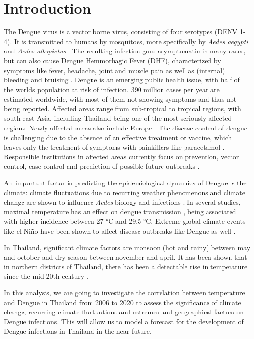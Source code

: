 \section{Introduction}\label{sec:introduction}

The Dengue virus is a vector borne virus, consisting of four serotypes (DENV 1-4).  It is transmitted to humans by mosquitoes, more specifically by \emph{Aedes aegypti} and \emph{Aedes albopictus} \citep{Phanitchat.2019}. The resulting infection goes asymptomatic in many cases, but can also cause Dengue Hemmorhagic Fever (DHF), characterized by symptoms like fever, headache, joint and muscle pain as well as (internal) bleeding and bruising \citep{Gubler.1998}.
Dengue is an emerging public health issue, with half of the worlds population at risk of infection. 390 million cases per year are estimated worldwide, with most of them not showing symptoms and thus not being reported. Affected areas range from sub-tropical to tropical regions, with south-east Asia, including Thailand being one of the most seriously affected regions. Newly affected areas also include Europe \citep{WHO.2023}.
The disease control of dengue is challenging due to the absence of an effective treatment or vaccine, which leaves only the treatment of symptoms with painkillers like paracetamol \citep{WHO.2023}. Responsible institutions in affected areas currently focus on prevention, vector control, case control and prediction of possible future outbreaks \citep{Phanitchat.2019}. 

An important factor in predicting the epidemiological dynamics of Dengue is the climate: climate fluctuations due to recurring weather phenomenons and climate change are shown to influence \emph{Aedes} biology and infections \citep{Descloux2012, Phanitchat.2019}.
In several studies, maximal temperature has an effect on dengue transmission \citep{Descloux2012}, being associated with higher incidence \citep{Phanitchat.2019} between 27 °C and 29,5 °C. Extreme global climate events like el Niño have been shown to affect disease outbreaks like Dengue as well \citep{Anyamba2019}.

In Thailand, significant climate factors are monsoon (hot and rainy) between may and october and dry season between november and april. It has been shown that in northern districts of Thailand, there has been a detectable rise in temperature since the mid 20th century \citep{Masud2016}.

In this analysis, we are going to investigate the correlation between temperature and Dengue in Thailand from 2006 to 2020 to assess the significance of climate change, recurring climate fluctuations and extremes and geographical factors on Dengue infections. This will allow us to model a forecast for the development of Dengue infections in Thailand in the near future. 
